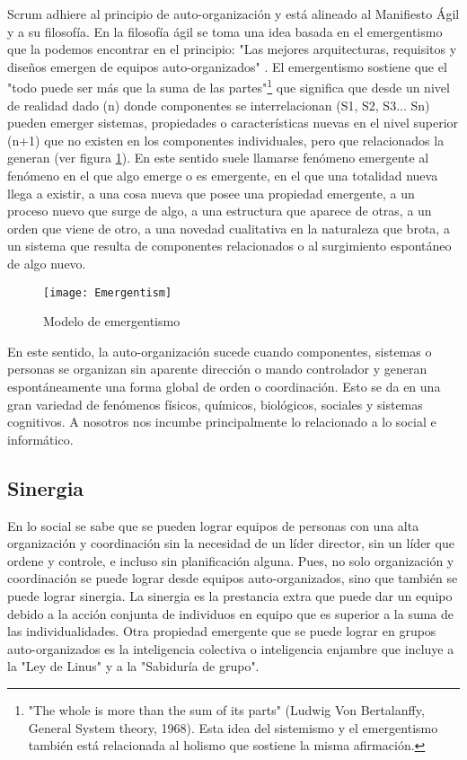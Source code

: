 Scrum adhiere al principio de auto-organización y está alineado al Manifiesto Ágil y a su filosofía. En la filosofía ágil se toma una idea basada en el emergentismo que la podemos encontrar en el principio: "Las mejores arquitecturas, requisitos y diseños emergen de equipos auto-organizados" \cite{Beck-2001}. El emergentismo sostiene que el "todo puede ser más que la suma de las partes"\footnote{"The whole is more than the sum of its parts" (Ludwig Von Bertalanffy, General System theory, 1968). Esta idea del sistemismo y el emergentismo también está relacionada al holismo que sostiene la misma afirmación.} que significa que desde un nivel de realidad dado (n) donde componentes se interrelacionan (S1, S2, S3... Sn) pueden emerger sistemas, propiedades o características nuevas en el nivel superior (n+1) que no existen en los componentes individuales, pero que relacionados la generan (ver figura \ref{fig:Emergentism}). En este sentido suele llamarse fenómeno emergente al fenómeno en el que algo emerge o es emergente, en el que una totalidad nueva llega a existir, a una cosa nueva que posee una propiedad emergente, a un proceso nuevo que surge de algo, a una estructura que aparece de otras, a un orden que viene de otro, a una novedad cualitativa en la naturaleza que brota, a un sistema que resulta de componentes relacionados o al surgimiento espontáneo de algo nuevo.

\begin{figure}[h]
  \centering
  \texttt{[image: Emergentism]}
  \caption{Modelo de emergentismo}
  \centering
  \label{fig:Emergentism} %
\end{figure}

En este sentido, la auto-organización sucede cuando componentes, sistemas o personas se organizan sin aparente dirección o mando controlador y generan espontáneamente una forma global de orden o coordinación. Esto se da en una gran variedad de fenómenos físicos, químicos, biológicos, sociales y sistemas cognitivos. A nosotros nos incumbe principalmente lo relacionado a lo social e informático. 

\subsection{Sinergia}

En lo social se sabe que se pueden lograr equipos de personas con una alta organización y coordinación sin la necesidad de un líder director, sin un líder que ordene y controle, e incluso sin planificación alguna. Pues, no solo organización y coordinación se puede lograr desde equipos auto-organizados, sino que también se puede lograr sinergia. La sinergia es la prestancia extra que puede dar un equipo debido a la acción conjunta de individuos en equipo que es superior a la suma de las individualidades. Otra propiedad emergente que se puede lograr en grupos auto-organizados es la inteligencia colectiva o inteligencia enjambre que incluye a la "Ley de Linus" y a la "Sabiduría de grupo".


